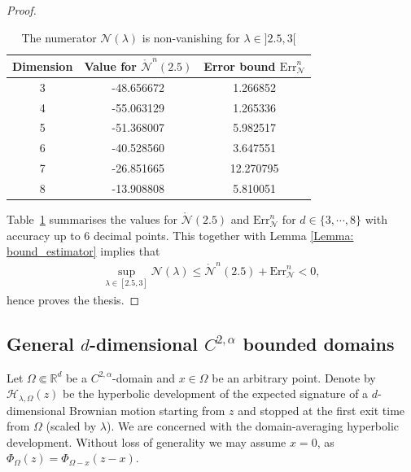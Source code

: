 \documentclass[11pt,a4paper,english,reqno]{amsart}
\theoremstyle{plain}
\newcommand{\1}{\mathbbm{1}}
\begin{document}
\begin{proof}
\begin{table}[ht]
\caption{The numerator $\mathcal{N}(\lambda)$ is non-vanishing for $\lambda \in ]2.5,3[$} %
\centering %
\begin{tabular}{c c c} %
\hline\hline %
Dimension & Value for $\mathring{\mathcal{N}}^n(2.5)$ & Error bound $\text{Err}^n_{\mathcal{N}} $ \\ [0.5ex] %
\hline %
3 & -48.656672  & 1.266852 \\ %
4 & -55.063129 & 1.265336\\
5 & -51.368007 & 5.982517  \\
6 & -40.528560 & 3.647551  \\
7 & -26.851665 & 12.270795 \\
8 & -13.908808 & 5.810051 \\ [1ex] %
\hline %
\end{tabular}
\label{table:arb d_ball_numerator}
\end{table}


Table~\ref{table:arb d_ball_numerator}  summarises the values for $\mathring{\mathcal{N}}(2.5)$ and $\text{Err}_\mathcal{N}^n$ for $d \in \{3, \cdots, 8\}$  with accuracy up to 6 decimal points. This together with Lemma \ref{Lemma: bound_estimator} implies that
\begin{eqnarray*}
\sup_{\lambda \in [2.5, 3]} \mathcal{N}(\lambda) \leq \mathring{\mathcal{N}}^{n}(2.5) + \text{Err}^{n}_{\mathcal{N}} < 0,
\end{eqnarray*}
hence proves the thesis.   \end{proof}






\subsection{General $d$-dimensional $C^{2, \alpha}$ bounded domains}


Let $\Omega\Subset\mathbb{R}^{d}$ be a $C^{2, \alpha}$-domain and $x \in \Omega$ be an arbitrary point. Denote by $\mathcal{H}_{\lambda, \Omega}(z)$ be the hyperbolic development of the expected signature of a  $d$-dimensional Brownian motion starting from $z$ and stopped at the first exit time from $\Omega$ (scaled by $\lambda$). We are concerned with the domain-averaging hyperbolic development. Without loss of generality we may assume $x=0$, as $\Phi_\Omega(z) = \Phi_{\Omega-x}(z-x)$. 
\end{document}
